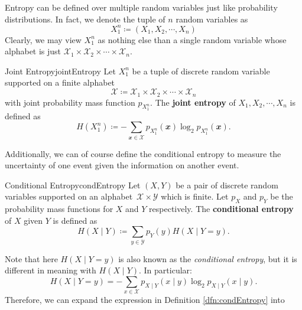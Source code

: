 \documentclass[math, code]{amznotes}
\theoremstyle{remark}
\begin{document}
Entropy can be defined over multiple random variables just like probability distributions. In fact, we denote the tuple of $n$ random variables as 
\begin{equation*}
    X_{1}^{n} \coloneqq \left(X_1, X_2, \cdots, X_n\right)
\end{equation*}
Clearly, we may view $X_1^n$ as nothing else than a single random variable whose alphabet is just $\mathcal{X}_1 \times \mathcal{X}_2 \times \cdots \times \mathcal{X}_n$.
\begin{dfnbox}{Joint Entropy}{jointEntropy}
    Let $X_1^n$ be a tuple of discrete random variable supported on a finite alphabet 
    \begin{equation*}
        \mathcal{X} \coloneqq \mathcal{X}_1 \times \mathcal{X}_2 \times \cdots \times \mathcal{X}_n
    \end{equation*}
    with joint probability mass function $p_{X_1^n}$. The {\color{red} \textbf{joint entropy}} of $X_1, X_2, \cdots, X_n$ is defined as 
    \begin{equation*}
        H\left(X_1^n\right) \coloneqq -\sum_{\mathbfit{x} \in \mathcal{X}}p_{X_1^n}\left(\mathbfit{x}\right)\log_{2}p_{X_1^n}\left(\mathbfit{x}\right).
    \end{equation*}
\end{dfnbox}
Additionally, we can of course define the conditional entropy to measure the uncertainty of one event given the information on another event.
\begin{dfnbox}{Conditional Entropy}{condEntropy}
    Let $\left(X, Y\right)$ be a pair of discrete random variables supported on an alphabet~$\mathcal{X} \times \mathcal{Y}$ which is finite. Let $p_X$ and $p_Y$ be the probability mass functions for $X$ and $Y$ respectively. The {\color{red} \textbf{conditional entropy}} of $X$ given $Y$ is defined as 
    \begin{equation*}
        H\left(X \mid Y\right) \coloneqq \sum_{y \in \mathcal{Y}}p_Y\left(y\right)H\left(X \mid Y = y\right).
    \end{equation*}
\end{dfnbox}
Note that here $H\left(X \mid Y = y\right)$ is also known as the \textit{conditional entropy}, but it is different in meaning with $H\left(X \mid Y\right)$. In particular:
\begin{equation*}
    H\left(X \mid Y = y\right) = -\sum_{x \in \mathcal{X}}p_{X \mid Y}\left(x \mid y\right)\log_2p_{X \mid Y}\left(x \mid y\right).
\end{equation*}
Therefore, we can expand the expression in Definition \ref{dfn:condEntropy} into
\end{document}
